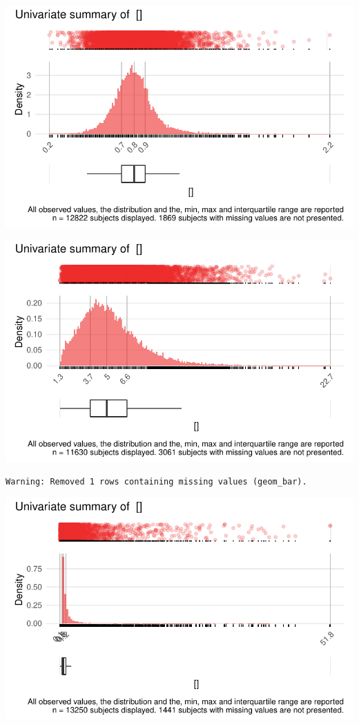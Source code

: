 \documentclass[
  letterpaper,
  DIV=11,
  numbers=noendperiod]{scrreport}
\begin{document}
\includegraphics{./Bact_univar_files/figure-pdf/uni04-17.pdf}

\includegraphics{./Bact_univar_files/figure-pdf/uni04-18.pdf}

\begin{verbatim}
Warning: Removed 1 rows containing missing values (geom_bar).
\end{verbatim}

\includegraphics{./Bact_univar_files/figure-pdf/uni04-19.pdf}
\end{document}
